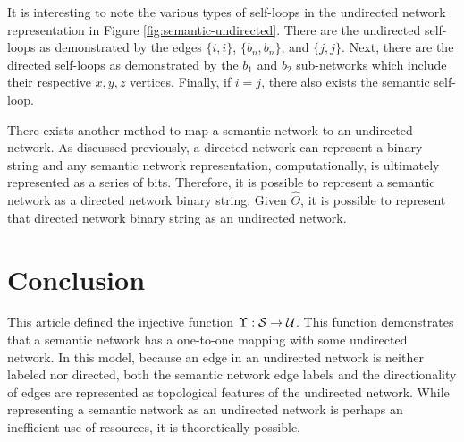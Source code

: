 \documentclass[twocolumn,preprintnumbers,amsmath,amssymb,letter]{revtex4}
\newcommand{\rar}{\rightarrow}
\begin{document}
It is interesting to note the various types of self-loops in the undirected network representation in Figure \ref{fig:semantic-undirected}. There are the undirected self-loops as demonstrated by the edges $\{i,i\}$, $\{b_n,b_n\}$, and $\{j,j\}$. Next, there are the directed self-loops as demonstrated by the $b_1$ and $b_2$ sub-networks which include their respective $x,y,z$ vertices. Finally, if $i = j$, there also exists the semantic self-loop.

There exists another method to map a semantic network to an undirected network. As discussed previously,  a directed network can represent a binary string and any semantic network representation, computationally, is ultimately represented as a series of bits. Therefore, it is possible to represent a semantic network as a directed network binary string. Given $\hat{\Theta}$, it is possible to represent that directed network binary string as an undirected network.

\section{Conclusion}

This article defined the injective function $\Upsilon: \cal{S} \rar \cal{U}$. This function demonstrates that a semantic network has a one-to-one mapping with some undirected network. In this model, because an edge in an undirected network is neither labeled nor directed, both the semantic network edge labels and the directionality of edges are represented as topological features of the undirected network. While representing a semantic network as an undirected network is perhaps an inefficient use of resources, it is theoretically possible.
\end{document}
